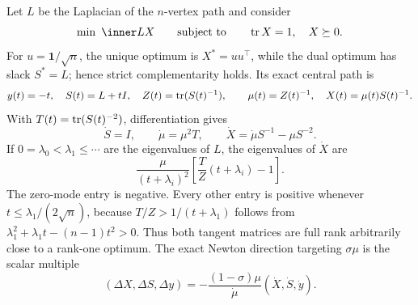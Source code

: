 Let $L$ be the Laplacian of the $n$-vertex path and consider
\begin{equation}
 \min\ \inner L X\qquad\text{subject to}\qquad
 \tr X=1,\quad X\succeq0.                                \label{eq:structural-path-sdp}
\end{equation}
For $u=\mathbf1/\sqrt n$, the unique optimum is $X^*=uu^\top$, while the
dual optimum has slack $S^*=L$; hence strict complementarity holds.  Its
exact central path is
\begin{equation}
 y(t)=-t,\quad S(t)=L+tI,\quad Z(t)=\operatorname{tr}(S(t)^{-1}),
 \qquad \mu(t)=Z(t)^{-1},\quad X(t)=\mu(t)S(t)^{-1}.      \label{eq:structural-path-center}
\end{equation}
With $T(t)=\operatorname{tr}(S(t)^{-2})$, differentiation gives
\begin{equation}
 \dot S=I,\qquad \dot\mu=\mu^2T,\qquad
 \dot X=\dot\mu S^{-1}-\mu S^{-2}.                       \label{eq:structural-path-tangent}
\end{equation}
If $0=\lambda_0<\lambda_1\leq\cdots$ are the eigenvalues of $L$, the
eigenvalues of $\dot X$ are
\begin{equation}
 \frac{\mu}{(t+\lambda_i)^2}
 \left[\frac TZ(t+\lambda_i)-1\right].                   \label{eq:structural-path-raw-spectrum}
\end{equation}
The zero-mode entry is negative.  Every other entry is positive whenever
$t\leq\lambda_1/(2\sqrt n)$, because
$T/Z>1/(t+\lambda_1)$ follows from
$\lambda_1^2+\lambda_1t-(n-1)t^2>0$.  Thus both tangent matrices are full
rank arbitrarily close to a rank-one optimum.  The exact Newton direction
targeting $\sigma\mu$ is the scalar multiple
\begin{equation}
 (\Delta X,\Delta S,\Delta y)
 =-\frac{(1-\sigma)\mu}{\dot\mu}(\dot X,\dot S,\dot y).
                                                               \label{eq:structural-path-newton}
\end{equation}

